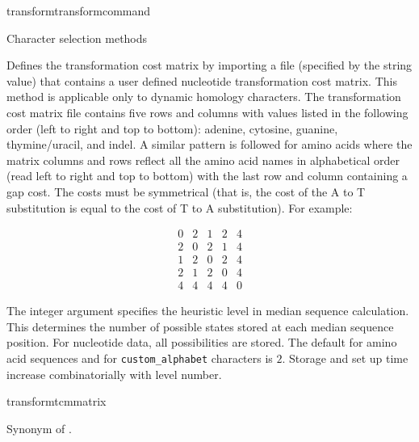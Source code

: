 \begin{command}{transform}{transformcommand}
\begin{arguments}
\begin{argumentgroup}{Character selection methods}
            {Defines the transformation cost matrix by importing a file (specified by
            the string value) that contains a user defined nucleotide
            transformation cost matrix. This method is applicable only to dynamic homology characters.
            The transformation cost matrix file contains five rows and columns
            with values listed in the following order (left to right and top to
            bottom): adenine, cytosine, guanine,
            thymine/uracil, and indel.  A similar pattern is followed for amino acids
            where the matrix columns and rows reflect all the amino acid names in alphabetical order
            (read left to right and top to bottom) with the last row and column containing a gap cost. 
            The costs must be symmetrical (that is, the
            cost of the A to T substitution is equal to the cost of T to A
            substitution). For example:

            \begin{equation*}
                \begin{array}{lllll}
                    0 &     2 &    1 &     2 &     4 \\
                    2 &     0 &    2 &     1 &     4 \\
                    1 &     2 &    0 &     2 &     4 \\
                    2 &     1 &    2 &     0 &     4 \\
                    4 &     4 &    4 &     4 &     0
                 \end{array}
            \end{equation*} 

            The integer argument specifies the heuristic level in median sequence 
            calculation.  This determines the number of possible states stored at 
            each median sequence position.  For nucleotide data, all possibilities 
            are stored.  The default for amino acid sequences and for 
            \texttt{custom\_alphabet} characters is $2$.  Storage and set up time 
            increase combinatorially with level number.}
            {transformtcmmatrix}
 
		{Synonym of  .}
		{}


\end{argumentgroup}
\end{arguments}
\end{command}
